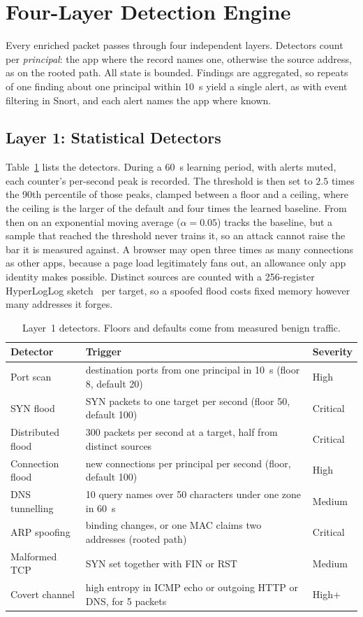 \documentclass[runningheads]{llncs}
\begin{document}
\section{Four-Layer Detection Engine}\label{sec:detection}

Every enriched packet passes through four independent layers. Detectors count per \emph{principal}: the app where the record names one, otherwise the source address, as on the rooted path. All state is bounded. Findings are aggregated, so repeats of one finding about one principal within 10~s yield a single alert, as with event filtering in Snort, and each alert names the app where known.

\subsection{Layer 1: Statistical Detectors}

Table~\ref{tab:l1} lists the detectors. During a 60~s learning period, with alerts muted, each counter's per-second peak is recorded. The threshold is then set to $2.5$ times the 90th percentile of those peaks, clamped between a floor and a ceiling, where the ceiling is the larger of the default and four times the learned baseline. From then on an exponential moving average ($\alpha=0.05$) tracks the baseline, but a sample that reached the threshold never trains it, so an attack cannot raise the bar it is measured against. A browser may open three times as many connections as other apps, because a page load legitimately fans out, an allowance only app identity makes possible. Distinct sources are counted with a 256-register HyperLogLog sketch~\cite{hyperloglog} per target, so a spoofed flood costs fixed memory however many addresses it forges.

\begin{table}[t]
\centering
\caption{Layer~1 detectors. Floors and defaults come from measured benign traffic.}\label{tab:l1}
\small
\begin{tabular}{@{}lll@{}}
\toprule
Detector & Trigger & Severity \\
\midrule
Port scan & destination ports from one principal in 10~s (floor 8, default 20) & High \\
SYN flood & SYN packets to one target per second (floor 50, default 100) & Critical \\
Distributed flood & 300 packets per second at a target, half from distinct sources & Critical \\
Connection flood & new connections per principal per second (floor, default 100) & High \\
DNS tunnelling & 10 query names over 50 characters under one zone in 60~s & Medium \\
ARP spoofing & binding changes, or one MAC claims two addresses (rooted path) & Critical \\
Malformed TCP & SYN set together with FIN or RST & Medium \\
Covert channel & high entropy in ICMP echo or outgoing HTTP or DNS, for 5 packets & High+ \\
\bottomrule
\end{tabular}
\end{table}
\end{document}
